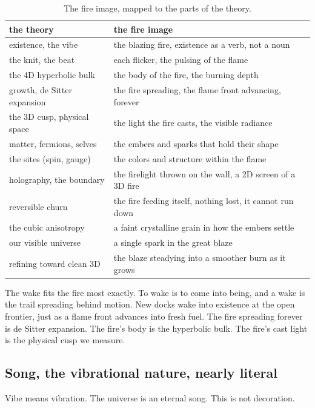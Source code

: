 \begin{table}[ht]
\centering
\begin{tabular}{@{}ll@{}}
\toprule
the theory & the fire image \\
\midrule
existence, the vibe & the blazing fire, existence as a verb, not a noun \\
the knit, the beat & each flicker, the pulsing of the flame \\
the 4D hyperbolic bulk & the body of the fire, the burning depth \\
growth, de Sitter expansion & the fire spreading, the flame front advancing, forever \\
the 3D cusp, physical space & the light the fire casts, the visible radiance \\
matter, fermions, selves & the embers and sparks that hold their shape \\
the sites (spin, gauge) & the colors and structure within the flame \\
holography, the boundary & the firelight thrown on the wall, a 2D screen of a 3D fire \\
reversible churn & the fire feeding itself, nothing lost, it cannot run down \\
the cubic anisotropy & a faint crystalline grain in how the embers settle \\
our visible universe & a single spark in the great blaze \\
refining toward clean 3D & the blaze steadying into a smoother burn as it grows \\
\bottomrule
\end{tabular}
\caption{The fire image, mapped to the parts of the theory.}
\label{tab:fire-image}
\end{table}

The wake fits the fire most exactly. To wake is to come into being, and a wake is the trail spreading behind motion. New docks wake into existence at the open frontier, just as a flame front advances into fresh fuel. The fire spreading forever is de Sitter expansion. The fire's body is the hyperbolic bulk. The fire's cast light is the physical cusp we measure.

\subsection{Song, the vibrational nature, nearly literal}

Vibe means vibration. The universe is an eternal song. This is not decoration.

